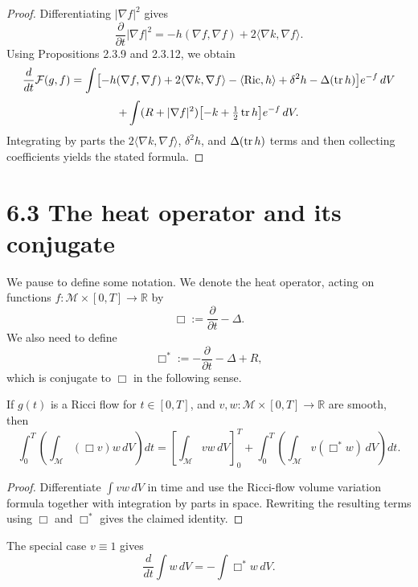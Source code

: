 \begin{proof}
Differentiating $|\nabla f|^2$ gives
\[
\frac{\partial}{\partial t}|\nabla f|^2
=-h(\nabla f,\nabla f)+2\langle\nabla k,\nabla f\rangle.
\]
Using Propositions 2.3.9 and 2.3.12, we obtain
\[
\frac{d}{dt}\mathcal F(g,f)
=\int \bigl[-h(\nabla f,\nabla f)+2\langle\nabla k,\nabla f\rangle-\langle\operatorname{Ric},h\rangle+\delta^2h-\Delta(\operatorname{tr} h)\bigr]e^{-f}\,dV
\]
\[
+\int (R+|\nabla f|^2)\bigl[-k+\tfrac12\operatorname{tr} h\bigr]e^{-f}\,dV.
\]
Integrating by parts the $2\langle\nabla k,\nabla f\rangle$, $\delta^2h$, and
$\Delta(\operatorname{tr} h)$ terms and then collecting coefficients yields the stated formula.
\end{proof}

\section{6.3 \quad The heat operator and its conjugate}

We pause to define some notation. We denote the heat operator, acting on
functions $f : \mathcal{M} \times [0,T] \to \mathbb{R}$ by
\[
  \Box := \frac{\partial}{\partial t} - \Delta.
\]
We also need to define
\[
  \Box^{*} := - \frac{\partial}{\partial t} - \Delta + R,
\]
which is conjugate to $\Box$ in the following sense.

\begin{proposition}
\label{topping-gradient-flow-conjugate-heat-operator}
If $g(t)$ is a Ricci flow for $t \in [0,T]$, and $v,w : \mathcal{M} \times
[0,T] \to \mathbb{R}$ are smooth, then
\[
  \int_0^T \left( \int_{\mathcal{M}} (\Box v) w\, dV \right) dt
  = \left[\int_{\mathcal{M}} v w\, dV\right]_0^T
  + \int_0^T \left( \int_{\mathcal{M}} v(\Box^{*} w)\, dV \right) dt.
\]
\end{proposition}

\begin{proof}
Differentiate $\int vw\,dV$ in time and use the Ricci-flow volume variation
formula together with integration by parts in space. Rewriting the resulting
terms using $\Box$ and $\Box^*$ gives the claimed identity.
\end{proof}

\begin{remark}
\label{topping-gradient-flow-conjugate-heat-special-case}
The special case $v\equiv 1$ gives
\[
  \frac{d}{dt} \int w\, dV = - \int \Box^{*} w\, dV.
\]
\end{remark}

